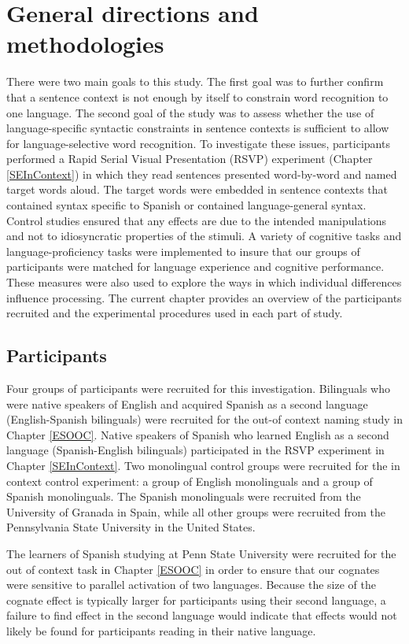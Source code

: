 \chapter{General directions and methodologies}\label{Roadmap}
There were two main goals to this study. The first goal was to further confirm that a sentence context is not enough by itself to constrain word recognition to one language. The second goal of the study was to assess whether the use of language-specific syntactic constraints in sentence contexts is sufficient to allow for language-selective word recognition. To investigate these issues, participants performed a Rapid Serial Visual Presentation (RSVP) experiment (Chapter \ref{SEInContext}) in which they read sentences presented word-by-word and named target words aloud. The target words were embedded in sentence contexts that contained syntax specific to Spanish or contained language-general syntax.  Control studies ensured that any effects are due to the intended manipulations and not to idiosyncratic properties of the stimuli. A variety of cognitive tasks and language-proficiency tasks were implemented to insure that our groups of participants were matched for language experience and cognitive performance. These  measures were also  used to explore the ways in which individual differences influence processing. The current chapter provides an overview of the participants recruited and the experimental procedures used in each part of study.

\section{Participants}\label{Roadmap::Participants}
Four groups of participants were recruited for this investigation. Bilinguals who were native speakers of English and acquired Spanish as a second language (English-Spanish bilinguals) were recruited for the out-of context naming study in Chapter \ref{ESOOC}. Native speakers of Spanish who learned English as a second language (Spanish-English bilinguals) participated in the RSVP experiment in Chapter \ref{SEInContext}. Two monolingual control groups were  recruited for the in context control experiment: a group of English monolinguals and a group of Spanish monolinguals. The Spanish monolinguals were recruited from the University of Granada in Spain, while all other groups were recruited from the Pennsylvania State University in the United States. 

The learners of Spanish studying at Penn State University were recruited for the out of context task in Chapter \ref{ESOOC} in order to ensure that our cognates were sensitive to parallel activation of two languages. Because the size of the cognate effect is typically larger for participants using their second language, a failure to find effect in the second language would indicate that effects would not likely be found for participants reading in their native language. 

